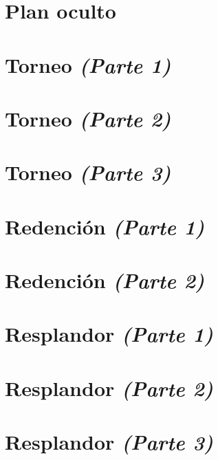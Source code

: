 \documentclass[11pt]{book}
\begin{document}
\chapter{Plan oculto}


\chapter{Torneo \emph{\mdseries(Parte 1)}}


\chapter{Torneo \emph{\mdseries(Parte 2)}}


\chapter{Torneo \emph{\mdseries(Parte 3)}}


\chapter{Redención \emph{\mdseries(Parte 1)}}


\chapter{Redención \emph{\mdseries(Parte 2)}}


\chapter{Resplandor \emph{\mdseries(Parte 1)}}


\chapter{Resplandor \emph{\mdseries(Parte 2)}}


\chapter{Resplandor \emph{\mdseries(Parte 3)}}

\end{document}
